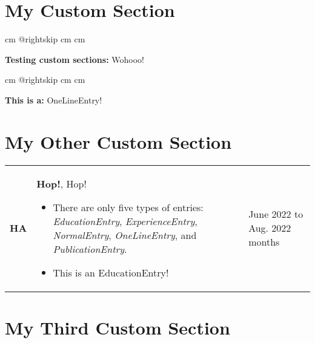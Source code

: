 \documentclass[10pt, a4paper]{article}
\newenvironment{highlights}{
        \begin{itemize}[
                topsep=0pt,
                parsep=0.07 cm,
                partopsep=0pt,
                itemsep=0pt,
                after=\vspace{-1\baselineskip},
                leftmargin=0.6 cm + 3pt
            ]
    }{
        \end{itemize}
    } %
\begin{document}
    \section{My Custom Section}
    
            \begingroup\raggedright
             cm
            \advance\csname @rightskip cm
            \advance{} cm

            \textbf{Testing custom sections:} Wohooo!

            \par\endgroup

        \vspace{0.12 cm}
            \begingroup\raggedright
             cm
            \advance\csname @rightskip cm
            \advance{} cm

            \textbf{This is a:} OneLineEntry!

            \par\endgroup



    \section{My Other Custom Section}
    
        \begin{tabularx}{ cm-0.13cm}{L{0.85cm} K{0.2 cm} R{3.6 cm}}
            \textbf{HA}
            & 
            \textbf{Hop!}, Hop!
            \vspace{0.12 cm}
            \begin{highlights}
                \item There are only five types of entries: \textit{EducationEntry}, \textit{ExperienceEntry}, \textit{NormalEntry}, \textit{OneLineEntry}, and \textit{PublicationEntry}. 
                \item This is an EducationEntry! \hspace*{-0.2cm}
            \end{highlights}
        &
            June 2022 to Aug. 2022  months
        \end{tabularx}



    \section{My Third Custom Section}
    
\end{document}
